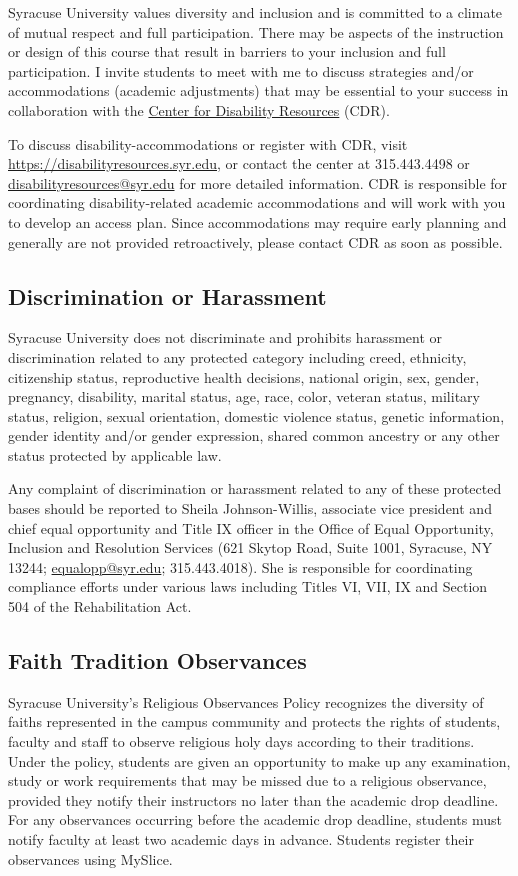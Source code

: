\documentclass[12pt]{article}
\begin{document}
Syracuse University values diversity and inclusion and is committed to a climate of mutual respect and full participation. There may be aspects of the instruction or design of this course that result in barriers to your inclusion and full participation. I invite students to meet with me to discuss strategies and/or accommodations (academic adjustments) that may be essential to your success in collaboration with the \href{https://disabilityresources.syr.edu}{Center for Disability Resources} (CDR).

To discuss disability-accommodations or register with CDR, visit \url{https://disabilityresources.syr.edu}, or contact the center at 315.443.4498 or \href{mailto:disabilityresources@syr.edu}{disabilityresources@syr.edu} for more detailed information. CDR is responsible for coordinating disability-related academic accommodations and will work with you to develop an access plan. Since accommodations may require early planning and generally are not provided retroactively, please contact CDR as soon as possible.

\subsection*{Discrimination or Harassment}

Syracuse University does not discriminate and prohibits harassment or discrimination related to any protected category including creed, ethnicity, citizenship status, reproductive health decisions, national origin, sex, gender, pregnancy, disability, marital status, age, race, color, veteran status, military status, religion, sexual orientation, domestic violence status, genetic information, gender identity and/or gender expression, shared common ancestry or any other status protected by applicable law.

Any complaint of discrimination or harassment related to any of these protected bases should be reported to Sheila Johnson-Willis, associate vice president and chief equal opportunity and Title IX officer in the Office of Equal Opportunity, Inclusion and Resolution Services (621 Skytop Road, Suite 1001, Syracuse, NY 13244; \href{mailto:equalopp@syr.edu}{equalopp@syr.edu}; 315.443.4018). She is responsible for coordinating compliance efforts under various laws including Titles VI, VII, IX and Section 504 of the Rehabilitation Act.

\subsection*{Faith Tradition Observances}

Syracuse University's Religious Observances Policy recognizes the diversity of faiths represented in the campus community and protects the rights of students, faculty and staff to observe religious holy days according to their traditions. Under the policy, students are given an opportunity to make up any examination, study or work requirements that may be missed due to a religious observance, provided they notify their instructors no later than the academic drop deadline. For any observances occurring before the academic drop deadline, students must notify faculty at least two academic days in advance. Students register their observances using MySlice.
\end{document}
